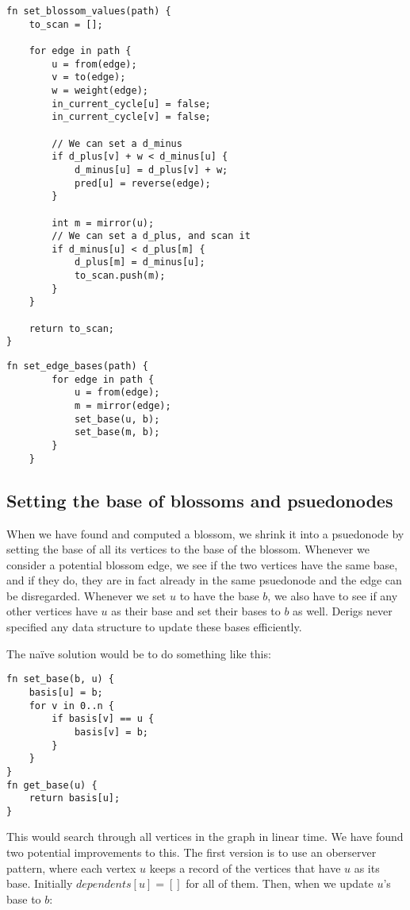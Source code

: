 \begin{lstlisting}[caption={Set blossom values},label=Listing,mathescape=true]
fn set_blossom_values(path) {
    to_scan = [];

    for edge in path {
        u = from(edge);
        v = to(edge);
        w = weight(edge);
        in_current_cycle[u] = false;
        in_current_cycle[v] = false;

        // We can set a d_minus
        if d_plus[v] + w < d_minus[u] {
            d_minus[u] = d_plus[v] + w;
            pred[u] = reverse(edge);
        }

        int m = mirror(u);
        // We can set a d_plus, and scan it
        if d_minus[u] < d_plus[m] {
            d_plus[m] = d_minus[u];
            to_scan.push(m);
        }
    }

    return to_scan;
}
\end{lstlisting}

\begin{lstlisting}[caption={Set edge bases},label=Listing,mathescape=true]
    fn set_edge_bases(path) {
        for edge in path {
            u = from(edge);
            m = mirror(edge);
            set_base(u, b);
            set_base(m, b);
        }
    }
    \end{lstlisting}

\subsection{Setting the base of blossoms and psuedonodes}
When we have found and computed a blossom, we shrink it into a psuedonode by setting the base of all its vertices to the base of the blossom. Whenever we consider a potential blossom edge, we see if the two vertices have the same base, and if they do, they are in fact already in the same psuedonode and the edge can be disregarded. Whenever we set $u$ to have the base $b$, we also have to see if any other vertices have $u$ as their base and set their bases to $b$ as well. Derigs never specified any data structure to update these bases efficiently.

The naïve solution would be to do something like this:
\begin{lstlisting}[caption={Näive basis},label=Listing,mathescape=true]
fn set_base(b, u) {
    basis[u] = b;
    for v in 0..n {
        if basis[v] == u {
            basis[v] = b;
        }
    }
}
fn get_base(u) {
    return basis[u];
}
\end{lstlisting}
This would search through all vertices in the graph in linear time. We have found two potential improvements to this. The first version is to use an oberserver pattern, where each vertex $u$ keeps a record of the vertices that have $u$ as its base. Initially $dependents[u] = []$ for all of them. Then, when we update $u$'s base to $b$:

